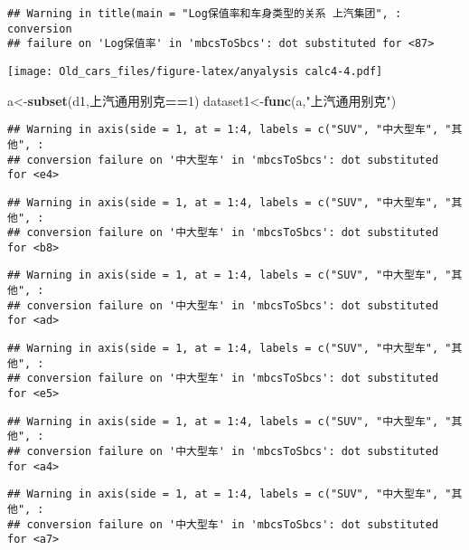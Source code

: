 \documentclass[]{article}
\newenvironment{Shaded}{\begin{snugshade}}{\end{snugshade}}
\newcommand{\KeywordTok}[1]{\textcolor[rgb]{0.13,0.29,0.53}{\textbf{#1}}}
\newcommand{\DecValTok}[1]{\textcolor[rgb]{0.00,0.00,0.81}{#1}}
\newcommand{\StringTok}[1]{\textcolor[rgb]{0.31,0.60,0.02}{#1}}
\newcommand{\OperatorTok}[1]{\textcolor[rgb]{0.81,0.36,0.00}{\textbf{#1}}}
\newcommand{\NormalTok}[1]{#1}
\begin{document}
\begin{verbatim}
## Warning in title(main = "Log保值率和车身类型的关系 上汽集团", : conversion
## failure on 'Log保值率' in 'mbcsToSbcs': dot substituted for <87>
\end{verbatim}

\texttt{[image: Old\_cars\_files/figure-latex/anyalysis calc4-4.pdf]}

\begin{Shaded}
\begin{Highlighting}[]
\NormalTok{a<-}\KeywordTok{subset}\NormalTok{(d1,上汽通用别克}\OperatorTok{==}\DecValTok{1}\NormalTok{)}
\NormalTok{dataset1<-}\KeywordTok{func}\NormalTok{(a,}\StringTok{"上汽通用别克"}\NormalTok{)}
\end{Highlighting}
\end{Shaded}

\begin{verbatim}
## Warning in axis(side = 1, at = 1:4, labels = c("SUV", "中大型车", "其他", :
## conversion failure on '中大型车' in 'mbcsToSbcs': dot substituted for <e4>
\end{verbatim}

\begin{verbatim}
## Warning in axis(side = 1, at = 1:4, labels = c("SUV", "中大型车", "其他", :
## conversion failure on '中大型车' in 'mbcsToSbcs': dot substituted for <b8>
\end{verbatim}

\begin{verbatim}
## Warning in axis(side = 1, at = 1:4, labels = c("SUV", "中大型车", "其他", :
## conversion failure on '中大型车' in 'mbcsToSbcs': dot substituted for <ad>
\end{verbatim}

\begin{verbatim}
## Warning in axis(side = 1, at = 1:4, labels = c("SUV", "中大型车", "其他", :
## conversion failure on '中大型车' in 'mbcsToSbcs': dot substituted for <e5>
\end{verbatim}

\begin{verbatim}
## Warning in axis(side = 1, at = 1:4, labels = c("SUV", "中大型车", "其他", :
## conversion failure on '中大型车' in 'mbcsToSbcs': dot substituted for <a4>
\end{verbatim}

\begin{verbatim}
## Warning in axis(side = 1, at = 1:4, labels = c("SUV", "中大型车", "其他", :
## conversion failure on '中大型车' in 'mbcsToSbcs': dot substituted for <a7>
\end{verbatim}
\end{document}
